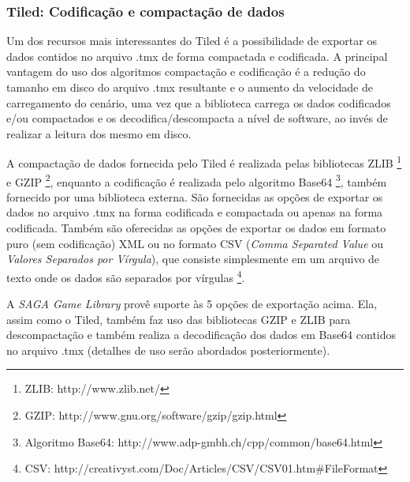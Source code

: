 \subsubsection{Tiled: Codificação e compactação de dados}
%
%
Um dos recursos mais interessantes do Tiled é a possibilidade de exportar os dados contidos no arquivo .tmx de forma compactada e codificada. A principal vantagem do uso dos algoritmos compactação e codificação é a redução do tamanho em disco do arquivo .tmx resultante e o aumento da velocidade de carregamento do cenário, uma vez que a biblioteca carrega os dados codificados e/ou compactados e os decodifica/descompacta a nível de software, ao invés de realizar a leitura dos mesmo em disco. 
\par 
A compactação de dados fornecida pelo Tiled é realizada pelas bibliotecas ZLIB \footnote{ZLIB: http://www.zlib.net/} e GZIP \footnote{GZIP: http://www.gnu.org/software/gzip/gzip.html}, enquanto a codificação é realizada pelo algoritmo Base64 \footnote{Algoritmo Base64: http://www.adp-gmbh.ch/cpp/common/base64.html}, também fornecido por uma biblioteca externa. São fornecidas as opções de exportar os dados no arquivo .tmx na forma codificada e compactada ou apenas na forma codificada. Também são oferecidas as opções de exportar os dados em formato puro (sem codificação) XML ou no formato CSV (\textit{Comma Separated Value} ou \textit{Valores Separados por Vírgula}), que consiste simplesmente em um arquivo de texto onde os dados são separados por vírgulas \footnote{CSV: http://creativyst.com/Doc/Articles/CSV/CSV01.htm\#FileFormat}. 
\par 
A \textit{SAGA Game Library} provê suporte às 5 opções de exportação acima. Ela, assim como o Tiled, também faz uso das bibliotecas GZIP e ZLIB para descompactação e também realiza a decodificação dos dados em Base64 contidos no arquivo .tmx (detalhes de uso serão abordados posteriormente).
%
%
%
%

